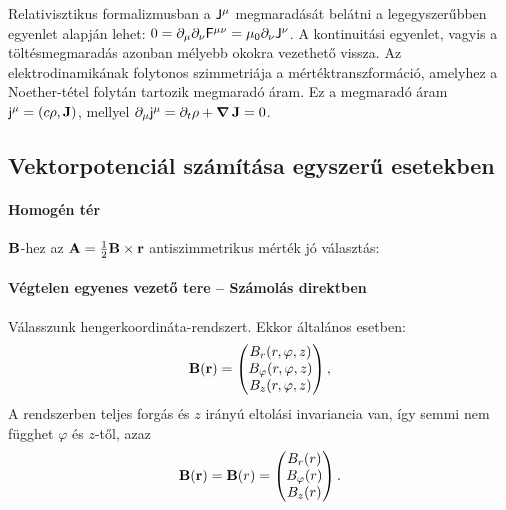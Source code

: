    Relativisztikus formalizmusban a $\mathsf{J}^\mu$ megmaradását belátni a legegyszerűbben  egyenlet alapján lehet: $0=\partial_\mu\partial_\nu \mathsf{F}^{\mu\nu}=\mu_0\partial_\nu\mathsf{J}^{\nu}$. A kontinuitási egyenlet, vagyis a töltésmegmaradás azonban mélyebb okokra vezethető vissza. Az elektrodinamikának folytonos szimmetriája a mértéktranszformáció, amelyhez a Noether-tétel folytán tartozik megmaradó áram. Ez a megmaradó áram $\mathsf{j}^\mu=(c\rho,\mathbf{J})$, mellyel $\partial_\mu\mathsf{j}^\mu=\partial_t\rho+\mathop{\boldsymbol{\nabla}}\nolimits\mathbf{J}=0$.
   
   
  \subsection{Vektorpotenciál számítása egyszerű esetekben}
   
   \paragraph{Homogén tér}
    
    $\mathbf{B}$-hez az $\mathbf{A}=\frac{1}{2}\mathbf{B}\times\mathbf{r}$ antiszimmetrikus mérték jó választás:
    
   \paragraph{Végtelen egyenes vezető tere -- Számolás direktben}
    
    Válasszunk hengerkoordináta-rendszert. Ekkor általános esetben:
    \[
     \mathbf{B}(\mathbf{r})=\begin{pmatrix}
                         B_r(r,\varphi,z) \\
                         B_\varphi(r,\varphi,z) \\
                         B_z(r,\varphi,z) 
                        \end{pmatrix},
    \]
    A rendszerben teljes forgás és $z$ irányú eltolási invariancia van, így semmi nem függhet $\varphi$ és $z$-től, azaz
    \[
     \mathbf{B}(\mathbf{r})=\mathbf{B}(r)=\begin{pmatrix}
                         B_r(r) \\
                         B_\varphi(r) \\
                         B_z(r) 
                        \end{pmatrix}.
    \]
    
